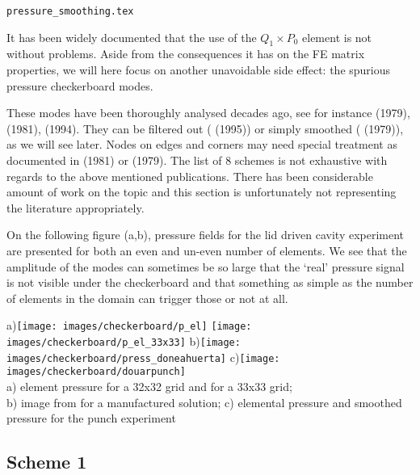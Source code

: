\begin{flushright} {\tiny {\color{gray} \tt pressure\_smoothing.tex}} \end{flushright}

It has been widely documented that the use of the $Q_1 \times P_0$ element is 
not without problems. Aside from the 
consequences it has on the FE matrix properties, we will here focus on another unavoidable side effect: 
the spurious pressure checkerboard modes. 

These modes have been thoroughly analysed decades ago, see for instance
\textcite{hulb79} (1979), 
\textcite{sagl81a,sagl81b} (1981),
\textcite{grsi94} (1994).
They can be filtered out (\textcite{chpc95} (1995)) 
or simply smoothed (\textcite{legs79} (1979)), as we will see later.
Nodes on edges and corners may need special treatment as documented in \textcite{sagl81a} (1981) 
or \textcite{legs79} (1979).
The list of 8 schemes is not exhaustive with regards to the above mentioned publications. 
There has been considerable amount of work on the topic and this section is 
unfortunately not representing the literature appropriately.

On the following figure (a,b), pressure fields for the lid driven cavity experiment 
are presented for both an even and un-even number of elements. We see that 
the amplitude of the modes can sometimes be so large that the `real' pressure signal is 
not visible under the checkerboard and that something as simple as the number of elements in the 
domain can trigger those or not at all.

\begin{center}
a)\texttt{[image: images/checkerboard/p\_el]}
\texttt{[image: images/checkerboard/p\_el\_33x33]}
b)\texttt{[image: images/checkerboard/press\_doneahuerta]}
c)\texttt{[image: images/checkerboard/douarpunch]}\\
{\captionfont a) element pressure for a 32x32 grid and for a 33x33 grid;\\ 
b) image from \cite[p307]{dohu03} for a manufactured solution;
c) elemental pressure and smoothed pressure for the punch experiment \cite{thfb08}}
\end{center}

\subsection{Scheme 1}


